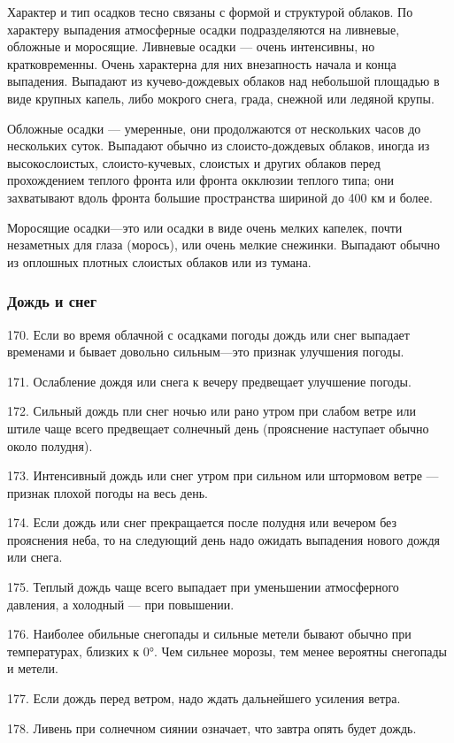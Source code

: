 Характер и тип осадков тесно связаны с формой и структурой облаков. По характеру выпадения атмосферные осадки подразделяются на ливневые, обложные и моросящие. Ливневые осадки — очень интенсивны, но кратковременны. Очень характерна для них внезапность начала и конца выпадения. Выпадают из кучево-дождевых облаков над небольшой площадью в виде крупных капель, либо мокрого снега, града, снежной или ледяной крупы.

Обложные осадки — умеренные, они продолжаются от нескольких часов до нескольких суток. Выпадают обычно из слоисто-дождевых облаков, иногда из высокослоистых, слоисто-кучевых, слоистых и других облаков перед прохождением теплого фронта или фронта окклюзии теплого типа; они захватывают вдоль фронта большие пространства шириной до 400 км и более.

Моросящие осадки—это или осадки в виде очень мелких капелек, почти незаметных для глаза (морось), или очень мелкие снежинки. Выпадают обычно из оплошных плотных слоистых облаков или из тумана.

\subsubsection{Дождь и снег}

170. Если во время облачной с осадками погоды дождь или снег выпадает временами и бывает довольно сильным—это признак улучшения погоды.

171. Ослабление дождя или снега к вечеру предвещает улучшение погоды.

172. Сильный дождь пли снег ночью или рано утром при слабом ветре или штиле чаще всего предвещает солнечный день (прояснение наступает обычно около полудня).

173. Интенсивный дождь или снег утром при сильном или штормовом ветре — признак плохой погоды на весь день.

174. Если дождь или снег прекращается после полудня или вечером без прояснения неба, то на следующий день надо ожидать выпадения нового дождя или снега.

175. Теплый дождь чаще всего выпадает при уменьшении атмосферного давления, а холодный — при повышении.

176. Наиболее обильные снегопады и сильные метели бывают обычно при температурах, близких к 0°. Чем сильнее морозы, тем менее вероятны снегопады и метели.

177. Если дождь перед ветром, надо ждать дальнейшего усиления ветра.

178. Ливень при солнечном сиянии означает, что завтра опять будет дождь.

